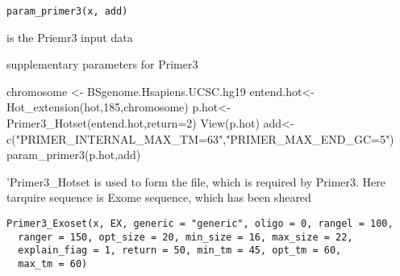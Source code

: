 \documentclass[a4paper]{book}
\begin{document}
%
\begin{Usage}
\begin{verbatim}
param_primer3(x, add)
\end{verbatim}
\end{Usage}
%
\begin{Arguments}
\begin{ldescription}
\item[\code{x}] is the Priemr3 input data

\item[\code{add}] supplementary parameters for Primer3
\end{ldescription}
\end{Arguments}
%
\begin{Examples}
\begin{ExampleCode}
chromosome <- BSgenome.Hsapiens.UCSC.hg19
entend.hot<-Hot_extension(hot,185,chromosome)
p.hot<-Primer3_Hotset(entend.hot,return=2)
View(p.hot)
add<-c("PRIMER_INTERNAL_MAX_TM=63","PRIMER_MAX_END_GC=5")
param_primer3(p.hot,add)
\end{ExampleCode}
\end{Examples}
%
\begin{Description}\relax
'Primer3\_Hotset is used to form the file, which is required by Primer3. Here tarquire sequence is
Exome sequence, which has been sheared
\end{Description}
%
\begin{Usage}
\begin{verbatim}
Primer3_Exoset(x, EX, generic = "generic", oligo = 0, rangel = 100,
  ranger = 150, opt_size = 20, min_size = 16, max_size = 22,
  explain_fiag = 1, return = 50, min_tm = 45, opt_tm = 60,
  max_tm = 60)
\end{verbatim}
\end{Usage}
%
\end{document}
